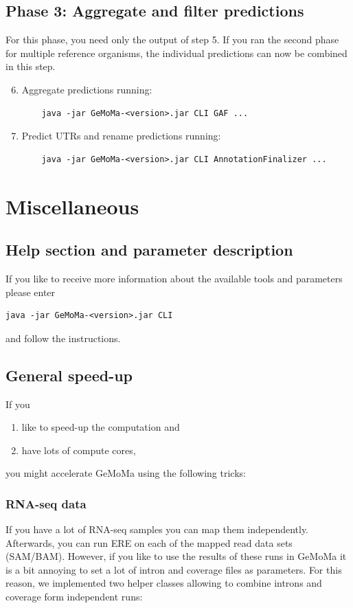 \documentclass{article}
\begin{document}
\subsection{Phase 3: Aggregate and filter predictions}
For this phase, you need only the output of step 5.
If you ran the second phase for multiple reference organisms, the individual predictions can now be combined in this step.

\begin{enumerate}
\setcounter{enumi}{5}
\item Aggregate predictions running: 
	\begin{verbatim}
	java -jar GeMoMa-<version>.jar CLI GAF ...
	\end{verbatim}
\item Predict UTRs and rename predictions running: 
	\begin{verbatim}
	java -jar GeMoMa-<version>.jar CLI AnnotationFinalizer ...
	\end{verbatim}
\end{enumerate}

\clearpage
\section{Miscellaneous}

\subsection{Help section and parameter description}
If you like to receive more information about the available tools and parameters please enter
\begin{verbatim}
java -jar GeMoMa-<version>.jar CLI
\end{verbatim}
and follow the instructions.

\subsection{General speed-up}
If you
\begin{enumerate}
\item like to speed-up the computation and
\item have lots of compute cores,
\end{enumerate}
you might accelerate GeMoMa using the following tricks:

\subsubsection{RNA-seq data}
If you have a lot of RNA-seq samples you can map them independently. Afterwards, you can run ERE on each of the mapped read data sets (SAM/BAM). However, if you like to use the results of these runs in GeMoMa it is a bit annoying to set a lot of intron and coverage files as parameters. For this reason, we implemented two helper classes allowing to combine introns and coverage form independent runs:
\end{document}

